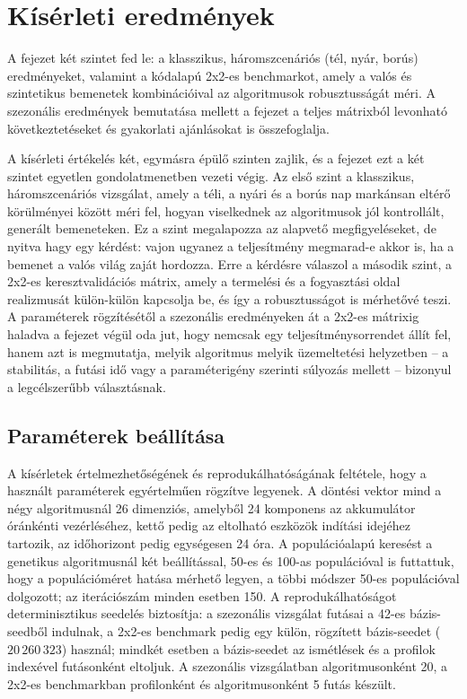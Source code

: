\chapter{Kísérleti eredmények}\label{ch:GYAK}

\begin{osszefoglal}
A fejezet két szintet fed le: a klasszikus, háromszcenáriós (tél, nyár, borús) eredményeket, valamint a kódalapú 2x2-es benchmarkot, amely a valós és szintetikus bemenetek kombinációival az algoritmusok robusztusságát méri. A szezonális eredmények bemutatása mellett a fejezet a teljes mátrixból levonható következtetéseket és gyakorlati ajánlásokat is összefoglalja.
\end{osszefoglal}

A kísérleti értékelés két, egymásra épülő szinten zajlik, és a fejezet ezt a két szintet egyetlen gondolatmenetben vezeti végig. Az első szint a klasszikus, háromszcenáriós vizsgálat, amely a téli, a nyári és a borús nap markánsan eltérő körülményei között méri fel, hogyan viselkednek az algoritmusok jól kontrollált, generált bemeneteken. Ez a szint megalapozza az alapvető megfigyeléseket, de nyitva hagy egy kérdést: vajon ugyanez a teljesítmény megmarad-e akkor is, ha a bemenet a valós világ zaját hordozza. Erre a kérdésre válaszol a második szint, a 2x2-es keresztvalidációs mátrix, amely a termelési és a fogyasztási oldal realizmusát külön-külön kapcsolja be, és így a robusztusságot is mérhetővé teszi. A paraméterek rögzítésétől a szezonális eredményeken át a 2x2-es mátrixig haladva a fejezet végül oda jut, hogy nemcsak egy teljesítménysorrendet állít fel, hanem azt is megmutatja, melyik algoritmus melyik üzemeltetési helyzetben -- a stabilitás, a futási idő vagy a paraméterigény szerinti súlyozás mellett -- bizonyul a legcélszerűbb választásnak.

\section{Paraméterek beállítása}\label{sec:parameterek}
A kísérletek értelmezhetőségének és reprodukálhatóságának feltétele, hogy a használt paraméterek egyértelműen rögzítve legyenek. A döntési vektor mind a négy algoritmusnál 26 dimenziós, amelyből 24 komponens az akkumulátor óránkénti vezérléséhez, kettő pedig az eltolható eszközök indítási idejéhez tartozik, az időhorizont pedig egységesen 24 óra. A populációalapú keresést a genetikus algoritmusnál két beállítással, 50-es és 100-as populációval is futtattuk, hogy a populációméret hatása mérhető legyen, a többi módszer 50-es populációval dolgozott; az iterációszám minden esetben 150. A reprodukálhatóságot determinisztikus seedelés biztosítja: a szezonális vizsgálat futásai a 42-es bázis-seedből indulnak, a 2x2-es benchmark pedig egy külön, rögzített bázis-seedet ($20\,260\,323$) használ; mindkét esetben a bázis-seedet az ismétlések és a profilok indexével futásonként eltoljuk. A szezonális vizsgálatban algoritmusonként 20, a 2x2-es benchmarkban profilonként és algoritmusonként 5 futás készült.

